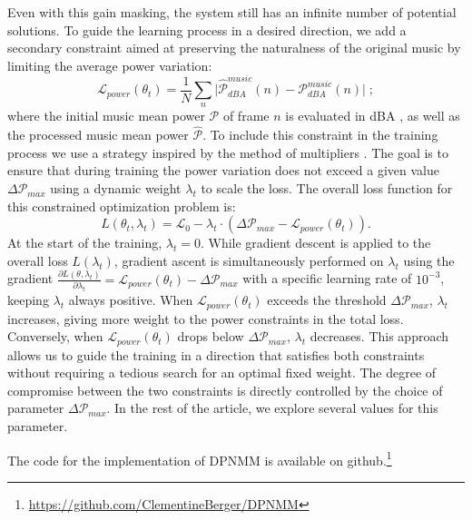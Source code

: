Even with this gain masking, the system still has an infinite number of potential solutions. To guide the learning process in a desired direction, we add a secondary constraint aimed at preserving the naturalness of the original music by limiting the average power variation: 
\begin{equation}
    \mathcal{L}_{power}(\theta_t) = \frac{1}{N} \sum_n \vert \hat{\mathcal{P}}_{dBA}^{music}(n) - \mathcal{P}_{dBA}^{music}(n) \vert \; ; 
\end{equation}
where the initial music mean power $\mathcal{P}$ of frame $n$ is evaluated in dBA \cite{a_weights}, as well as the processed music mean power $\hat{\mathcal{P}}$. To include this constraint in the training process we use a strategy inspired by the method of multipliers \cite{jonasdegraveHowWeCan2021, plattConstrainedDifferentialOptimization1987}. The goal is to ensure that during training the power variation does not exceed a given value $\Delta \mathcal{P}_{max}$ using a dynamic weight $\lambda_t$ to scale the loss. The overall loss function for this constrained optimization problem is:
\begin{equation}
    L(\theta_t, \lambda_t) = \mathcal{L}_0 - \lambda_t \cdot (\Delta \mathcal{P}_{max} - \mathcal{L}_{power}(\theta_t)).
\end{equation}
At the start of the training, $\lambda_t = 0$. While gradient descent is applied to the overall loss $L(\lambda_t)$, gradient ascent is simultaneously performed on $\lambda_t$ using the gradient $\frac{\partial L(\theta, \lambda_t)}{\partial \lambda_t} = \mathcal{L}_{power}(\theta_t) - \Delta \mathcal{P}_{max}$ with a specific learning rate of $10^{-3}$, keeping $\lambda_t$ always positive. When $\mathcal{L}_{power}(\theta_t)$ exceeds the threshold $\Delta \mathcal{P}_{max}$, $\lambda_t$ increases, giving more weight to the power constraints in the total loss. Conversely, when $\mathcal{L}_{power}(\theta_t)$ drops below $\Delta \mathcal{P}_{max}$, $\lambda_t$ decreases.
This approach allows us to guide the training in a direction that satisfies both constraints without requiring a tedious search for an optimal fixed weight. The degree of compromise between the two constraints is directly controlled by the choice of parameter $\Delta \mathcal{P}_{max}$. In the rest of the article, we explore several values for this parameter. 

The code for the implementation of DPNMM is available on github.\footnote{\href{https://github.com/ClementineBerger/DPNMM}{https://github.com/ClementineBerger/DPNMM}}